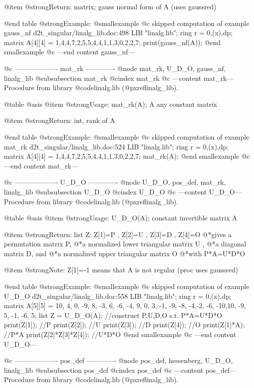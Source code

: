 @item @strong{Return:}
matrix; gauss normal form of A (uses gaussred)

@end table
@strong{Example:}
@smallexample
@c skipped computation of example gauss_nf d2t_singular/linalg_lib.doc:498 
LIB "linalg.lib";
ring r = 0,(x),dp;
matrix A[4][4] = 1,4,4,7,2,5,5,4,4,1,1,3,0,2,2,7;
print(gauss_nf(A));
@end smallexample
@c ---end content gauss_nf---

@c ------------------- mat_rk -------------
@node mat_rk, U_D_O, gauss_nf, linalg_lib
@subsubsection mat_rk
@cindex mat_rk
@c ---content mat_rk---
Procedure from library @code{linalg.lib} (@pxref{linalg_lib}).

@table @asis
@item @strong{Usage:}
mat_rk(A); A any constant matrix

@item @strong{Return:}
int, rank of A

@end table
@strong{Example:}
@smallexample
@c skipped computation of example mat_rk d2t_singular/linalg_lib.doc:524 
LIB "linalg.lib";
ring r = 0,(x),dp;
matrix A[4][4] = 1,4,4,7,2,5,5,4,4,1,1,3,0,2,2,7;
mat_rk(A);
@end smallexample
@c ---end content mat_rk---

@c ------------------- U_D_O -------------
@node U_D_O, pos_def, mat_rk, linalg_lib
@subsubsection U_D_O
@cindex U_D_O
@c ---content U_D_O---
Procedure from library @code{linalg.lib} (@pxref{linalg_lib}).

@table @asis
@item @strong{Usage:}
U_D_O(A); constant invertible matrix A

@item @strong{Return:}
list Z: Z[1]=P , Z[2]=U , Z[3]=D , Z[4]=O
@*gives a permutation matrix P,
@*a normalized lower triangular matrix U ,
@*a diagonal matrix D, and
@*a normalized upper triangular matrix O
@*with P*A=U*D*O

@item @strong{Note:}
Z[1]=-1 means that A is not regular (proc uses gaussred)

@end table
@strong{Example:}
@smallexample
@c skipped computation of example U_D_O d2t_singular/linalg_lib.doc:558 
LIB "linalg.lib";
ring r = 0,(x),dp;
matrix A[5][5] = 10, 4,  0, -9,  8,
-3, 6, -6, -4,  9,
0, 3, -1, -9, -8,
-4,-2, -6, -10,10,
-9, 5, -1, -6,  5;
list Z = U_D_O(A);              //construct P,U,D,O s.t. P*A=U*D*O
print(Z[1]);                    //P
print(Z[2]);                    //U
print(Z[3]);                    //D
print(Z[4]);                    //O
print(Z[1]*A);                  //P*A
print(Z[2]*Z[3]*Z[4]);          //U*D*O
@end smallexample
@c ---end content U_D_O---

@c ------------------- pos_def -------------
@node pos_def, hessenberg, U_D_O, linalg_lib
@subsubsection pos_def
@cindex pos_def
@c ---content pos_def---
Procedure from library @code{linalg.lib} (@pxref{linalg_lib}).

